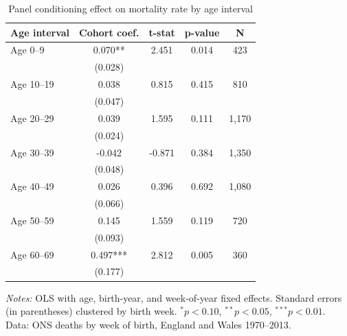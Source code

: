 \begin{table}[htbp]
  \centering
  \small

  \caption{Panel conditioning effect on mortality rate by age interval}
  \label{tab:age-intervals}
  \begin{tabular}{lcccc}
  \toprule
  \textbf{Age interval} & \textbf{Cohort coef.} & \textbf{t-stat} & \textbf{p-value} & \textbf{N} \\
  \midrule
  Age 0–9 & 0.070** & 2.451 & 0.014 & 423 \\
  & (0.028) & & & \\
  Age 10–19 & 0.038 & 0.815 & 0.415 & 810 \\
  & (0.047) & & & \\
  Age 20–29 & 0.039 & 1.595 & 0.111 & 1,170 \\
  & (0.024) & & & \\
  Age 30–39 & -0.042 & -0.871 & 0.384 & 1,350 \\
  & (0.048) & & & \\
  Age 40–49 & 0.026 & 0.396 & 0.692 & 1,080 \\
  & (0.066) & & & \\
  Age 50–59 & 0.145 & 1.559 & 0.119 & 720 \\
  & (0.093) & & & \\
  Age 60–69 & 0.497*** & 2.812 & 0.005 & 360 \\
  & (0.177) & & & \\
  \bottomrule
  \end{tabular}
  \begin{tablenotes}
    \footnotesize
    \item \textit{Notes:} OLS with age, birth-year, and week-of-year fixed effects.
    Standard errors (in parentheses) clustered by birth week.
    $^{*}p<0.10$, $^{**}p<0.05$, $^{***}p<0.01$.
    Data: ONS deaths by week of birth, England and Wales 1970--2013.
  \end{tablenotes}
\end{table}
